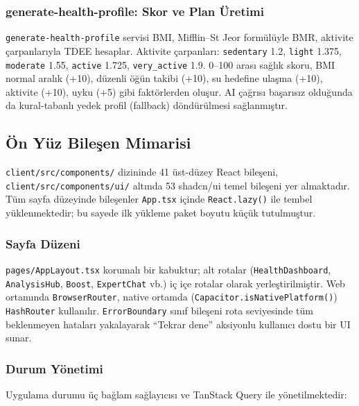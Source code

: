 \subsubsection{generate-health-profile: Skor ve Plan Üretimi}

\texttt{generate-health-profile} servisi BMI, Mifflin--St Jeor formülüyle BMR, aktivite çarpanlarıyla TDEE hesaplar. Aktivite çarpanları: \texttt{sedentary} 1.2, \texttt{light} 1.375, \texttt{moderate} 1.55, \texttt{active} 1.725, \texttt{very\_active} 1.9. 0--100 arası sağlık skoru, BMI normal aralık (+10), düzenli öğün takibi (+10), su hedefine ulaşma (+10), aktivite (+10), uyku (+5) gibi faktörlerden oluşur. AI çağrısı başarısız olduğunda da kural-tabanlı yedek profil (fallback) döndürülmesi sağlanmıştır.

\subsection{Ön Yüz Bileşen Mimarisi}

\texttt{client/src/components/} dizininde 41 üst-düzey React bileşeni, \texttt{client/src/components/ui/} altında 53 shadcn/ui temel bileşeni yer almaktadır. Tüm sayfa düzeyinde bileşenler \texttt{App.tsx} içinde \texttt{React.lazy()} ile tembel yüklenmektedir; bu sayede ilk yükleme paket boyutu küçük tutulmuştur.

\subsubsection{Sayfa Düzeni}

\texttt{pages/AppLayout.tsx} korumalı bir kabuktur; alt rotalar (\texttt{HealthDashboard}, \texttt{AnalysisHub}, \texttt{Boost}, \texttt{ExpertChat} vb.) iç içe rotalar olarak yerleştirilmiştir. Web ortamında \texttt{BrowserRouter}, native ortamda (\texttt{Capacitor.isNativePlatform()}) \texttt{HashRouter} kullanılır. \texttt{ErrorBoundary} sınıf bileşeni rota seviyesinde tüm beklenmeyen hataları yakalayarak \enquote{Tekrar dene} aksiyonlu kullanıcı dostu bir UI sunar.

\subsubsection{Durum Yönetimi}

Uygulama durumu üç bağlam sağlayıcısı ve TanStack Query ile yönetilmektedir:


